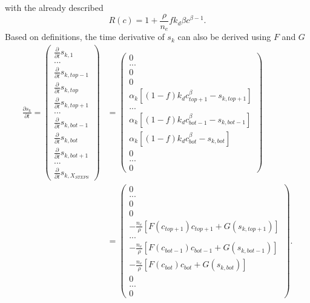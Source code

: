 with the already described
\begin{equation}
    R(c) = 1 + \frac{\rho}{n_e}f k_d \beta c^{\beta -1}.
\end{equation}
Based on definitions, the time derivative of $s_k$ can also be derived using $F$ and $G$
\begin{align}
    \frac{\partial s_k}{\partial t} = \left(\begin{matrix}  \frac{\partial}{\partial t} s_{k,1}\\ ...\\\frac{\partial}{\partial t} s_{k, top-1}\\\frac{\partial}{\partial t} s_{k, top}\\\frac{\partial}{\partial t} s_{k, top+1}\\...\\\frac{\partial}{\partial t} s_{k, bot-1}\\\frac{\partial}{\partial t} s_{k, bot}\\\frac{\partial}{\partial t} s_{k, bot+1}\\
    ...\\ \frac{\partial}{\partial t} s_{k, X_{STEPS}} \end{matrix}\right) &= \left(\begin{matrix}  0\\ ...\\0\\0\\\alpha_k \left[(1-f)k_dc_{top+1}^{\beta} - s_{k, top+1}\right]\\...\\\alpha_k \left[(1-f)k_dc_{bot-1}^{\beta} - s_{k, bot-1}\right]\\\alpha_k \left[(1-f)k_dc_{bot}^{\beta} - s_{k, bot}\right]\\0\\
    ...\\ 0 \end{matrix}\right)\nonumber\\ &=\left(\begin{matrix}  0\\ ...\\0\\0\\-\frac{n_e}{\rho} \left[F(c_{top+1})c_{top+1} + G(s_{k,top+1})\right]\\...\\-\frac{n_e}{\rho}\left[F(c_{bot-1})c_{bot-1} + G(s_{k,bot-1})\right]\\-\frac{n_e}{\rho} \left[F(c_{bot})c_{bot} + G(s_{k,bot})\right]\\0\\
    ...\\ 0 \end{matrix}\right).
\end{align}
